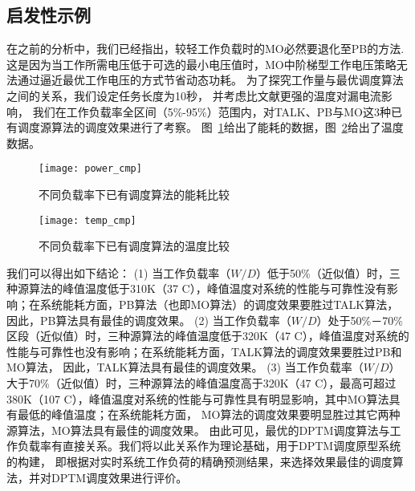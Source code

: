 \subsection{启发性示例}
在之前的分析中，我们已经指出，较轻工作负载时的MO必然要退化至PB的方法. 这是因为当工作所需电压低于可选的最小电压值时，MO中阶梯型工作电压策略无法通过逼近最优工作电压的方式节省动态功耗。 为了探究工作量与最优调度算法之间的关系，我们设定任务长度为10秒， 并考虑比文献更强的温度对漏电流影响， 我们在工作负载率全区间（5\%-95\%）范围内，对TALK、PB与MO这3种已有调度源算法的调度效果进行了考察。 图~\ref{fig:exp_power_cmp}给出了能耗的数据，图~\ref{fig:exp_temp_cmp}给出了温度数据。
\begin{figure}%
  \centering
  \texttt{[image: power\_cmp]}
  \caption{不同负载率下已有调度算法的能耗比较}
  \label{fig:exp_power_cmp}
\end{figure}
\begin{figure}%
  \centering
  \texttt{[image: temp\_cmp]}
  \caption{不同负载率下已有调度算法的温度比较}
  \label{fig:exp_temp_cmp}
\end{figure}
我们可以得出如下结论：
(1)	当工作负载率（$W/D$）低于50\%（近似值）时，三种源算法的峰值温度低于310K（37 C），峰值温度对系统的性能与可靠性没有影响；在系统能耗方面，PB算法（也即MO算法）的调度效果要胜过TALK算法， 因此，PB算法具有最佳的调度效果。
(2)	当工作负载率（$W/D$）处于50\%－70\%区段（近似值）时，三种源算法的峰值温度低于320K（47 C），峰值温度对系统的性能与可靠性也没有影响；在系统能耗方面，TALK算法的调度效果要胜过PB和MO算法， 因此，TALK算法具有最佳的调度效果。
(3)	当工作负载率（$W/D$）大于70\%（近似值）时，三种源算法的峰值温度高于320K（47 C），最高可超过380K（107 C），峰值温度对系统的性能与可靠性具有明显影响，其中MO算法具有最低的峰值温度；在系统能耗方面， MO算法的调度效果要明显胜过其它两种源算法，MO算法具有最佳的调度效果。
由此可见，最优的DPTM调度算法与工作负载率有直接关系。我们将以此关系作为理论基础，用于DPTM调度原型系统的构建， 即根据对实时系统工作负荷的精确预测结果，来选择效果最佳的调度算法，并对DPTM调度效果进行评价。

